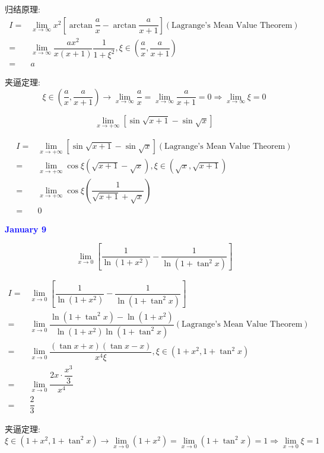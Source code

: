 \begin{solution}
	
	归结原理:
	\begin{align*}
		I = & \lim\limits_{x\to \infty}x^{2}[\arctan\dfrac{a}{x}-\arctan \dfrac{a}{x+1}](\text{Lagrange's Mean Value Theorem})\\
		  = & \lim\limits_{x\to \infty}\dfrac{ax^{2}}{x(x+1)}\dfrac{1}{1+\xi^{2}},\xi\in(\dfrac{a}{x},\dfrac{a}{x+1})\\
		  = & a
	\end{align*}

	夹逼定理: 
	$$\xi\in (\dfrac{a}{x},\dfrac{a}{x+1})\to \lim\limits_{x\to \infty}\dfrac{a}{x} = \lim\limits_{x\to \infty}\dfrac{a}{x+1}=0\Rightarrow \lim\limits_{x\to \infty}\xi = 0$$
\end{solution}

\begin{example}[][Exam: 27.2.2]
	$$\lim\limits_{x\to +\infty}[\sin\sqrt{x+1}-\sin\sqrt{x}]$$
\end{example}

\begin{solution}
	
	\begin{align*}
		I = & \lim\limits_{x\to +\infty}[\sin\sqrt{x+1}-\sin\sqrt{x}](\text{Lagrange's Mean Value Theorem})\\
		  = & \lim\limits_{x\to +\infty}\cos \xi(\sqrt{x+1}-\sqrt{x}),\xi\in(\sqrt{x},\sqrt{x+1})\\
		  = & \lim\limits_{x\to +\infty}\cos \xi(\dfrac{1}{\sqrt{x+1}+\sqrt{x}})\\
		  = & 0
	\end{align*}
\end{solution}

\textcolor{blue}{\textbf{January 9}}

\begin{example}[][Exam: 27.2.3]
	$$\lim\limits_{x\to 0}\left[\dfrac{1}{\ln(1+x^{2})}-\dfrac{1}{\ln(1+\tan^{2}x)}\right]$$
\end{example}

\begin{solution}
	
	\begin{align*}
		I = & \lim\limits_{x\to 0}\left[\dfrac{1}{\ln(1+x^{2})}-\dfrac{1}{\ln(1+\tan^{2}x)}\right]\\
		  = & \lim\limits_{x\to 0}\dfrac{\ln(1+\tan^{2}x)-\ln(1+x^{2})}{\ln(1+x^{2})\ln(1+\tan^{2}x)}(\text{Lagrange's Mean Value Theorem})\\
		  = & \lim\limits_{x\to 0}\dfrac{(\tan x+x)(\tan x-x)}{x^{4}\xi}, \xi\in(1+x^{2},1+\tan^{2}x)\\
		  = & \lim\limits_{x\to 0}\dfrac{2x\cdot \dfrac{x^{3}}{3}}{x^{4}}\\
		  = & \dfrac{2}{3}
	\end{align*}

	夹逼定理: 
	$$\xi\in(1+x^{2},1+\tan^{2}x)\to \lim\limits_{x\to 0}(1+x^{2}) = \lim\limits_{x\to 0} (1+\tan^{2}x) = 1\Rightarrow \lim\limits_{x\to 0}\xi = 1$$
\end{solution}

